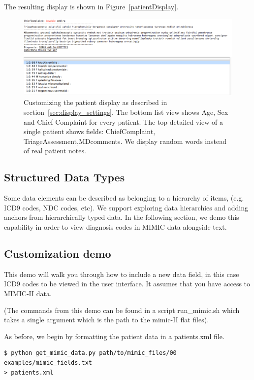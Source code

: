 \documentclass[12pt]{article}
\begin{document}
The resulting display is shown in Figure~\ref{patientDisplay}.
\begin{figure}[ht]
	\begin{center}
		\includegraphics[scale=0.5]{patientDisplayScreenshot}
	\end{center}
	\caption{\label{patientDisplay} Customizing the patient display as described in section~\ref{sec:display_settings}. The bottom list view shows Age, Sex and Chief Complaint for every patient. The top detailed view of a single patient shows fields: ChiefComplaint, TriageAssessment,MDcomments. We display random words instead of real patient notes.}
	\label{fig:figure1}
\end{figure}

\subsection{Structured Data Types}
Some data elements can be described as belonging to a hierarchy of items, (e.g. ICD9 codes, NDC codes, etc). 
We support exploring data hierarchies and adding anchors from hierarchically typed data.
In the following section, we demo this capability in order to view diagnosis codes in MIMIC data alongside text.

\subsection{Customization demo}
\label{sec:customization demo}
This demo will walk you through how to include a new data field, in this case ICD9 codes to be viewed in the user interface. It assumes that you have access to MIMIC-II data.

(The commands from this demo can be found in a script run\_mimic.sh which takes a single argument which is the path to the mimic-II flat files). 

As before, we begin by formatting the patient data in a patients.xml file.
\begin{verbatim}
$ python get_mimic_data.py path/to/mimic_files/00 examples/mimic_fields.txt 
> patients.xml
\end{verbatim}
\end{document}
